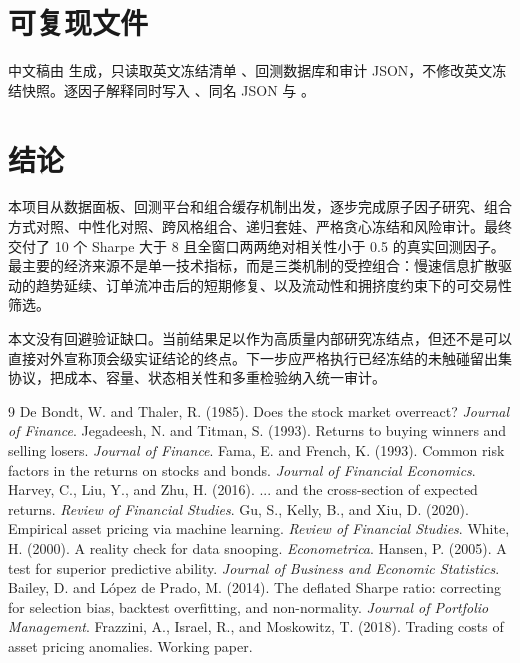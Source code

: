 \documentclass[10pt,a4paper]{article}
\begin{document}
\section{可复现文件}
中文稿由  生成，只读取英文冻结清单 、回测数据库和审计 JSON，不修改英文冻结快照。逐因子解释同时写入 、同名 JSON 与 。

\section{结论}
本项目从数据面板、回测平台和组合缓存机制出发，逐步完成原子因子研究、组合方式对照、中性化对照、跨风格组合、递归套娃、严格贪心冻结和风险审计。最终交付了 10 个 Sharpe 大于 8 且全窗口两两绝对相关性小于 0.5 的真实回测因子。最主要的经济来源不是单一技术指标，而是三类机制的受控组合：慢速信息扩散驱动的趋势延续、订单流冲击后的短期修复、以及流动性和拥挤度约束下的可交易性筛选。

本文没有回避验证缺口。当前结果足以作为高质量内部研究冻结点，但还不是可以直接对外宣称顶会级实证结论的终点。下一步应严格执行已经冻结的未触碰留出集协议，把成本、容量、状态相关性和多重检验纳入统一审计。

\begin{thebibliography}{9}
 De Bondt, W. and Thaler, R. (1985). Does the stock market overreact? \emph{Journal of Finance}.
 Jegadeesh, N. and Titman, S. (1993). Returns to buying winners and selling losers. \emph{Journal of Finance}.
 Fama, E. and French, K. (1993). Common risk factors in the returns on stocks and bonds. \emph{Journal of Financial Economics}.
 Harvey, C., Liu, Y., and Zhu, H. (2016). ... and the cross-section of expected returns. \emph{Review of Financial Studies}.
 Gu, S., Kelly, B., and Xiu, D. (2020). Empirical asset pricing via machine learning. \emph{Review of Financial Studies}.
 White, H. (2000). A reality check for data snooping. \emph{Econometrica}.
 Hansen, P. (2005). A test for superior predictive ability. \emph{Journal of Business and Economic Statistics}.
 Bailey, D. and L{\'o}pez de Prado, M. (2014). The deflated Sharpe ratio: correcting for selection bias, backtest overfitting, and non-normality. \emph{Journal of Portfolio Management}.
 Frazzini, A., Israel, R., and Moskowitz, T. (2018). Trading costs of asset pricing anomalies. Working paper.
\end{thebibliography}
\end{document}
